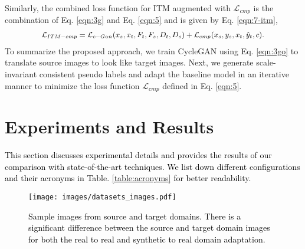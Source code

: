 \documentclass[final,5p,times,twocolumn]{elsarticle}
\begin{document}
Similarly, the combined loss function for ITM augmented with $\mathcal{L}_{cmp}$ is the combination of Eq. \ref{eqn:3g} and Eq. \ref{eqn:5}
and is given by Eq. \ref{eqn:7-itm},
\begin{equation}
\small
\begin{split}
\mathcal{L}_{ITM-cmp} = \mathcal{L}_{c-Gan} ( x_s, x_t, F_t, F_s, D_t, D_s)
    + \mathcal{L}_{cmp} ( x_s, y_s, x_t, \hat{y}_t, c).
\end{split}
\label{eqn:7-itm}
\end{equation}
To summarize the proposed approach, we train CycleGAN using Eq. \ref{eqn:3go} to translate source images to look like target images. Next, we generate scale-invariant consistent pseudo labels and adapt the baseline model in an iterative manner to minimize the loss function $\mathcal{L}_{cmp}$ defined in Eq. \ref{eqn:5}.  

\section{Experiments and Results}
\label{sec:exp}
\textcolor{black}{This section discusses experimental details and provides the results of our comparison with state-of-the-art techniques.
We list down different configurations and their acronyms in Table. \ref{table:acronyms} for better readability. }
\begin{table}[H]
\footnotesize
\centering
\caption{Different configurations and their acronyms.}
\label{table:acronyms}
\end{table}


\begin{figure*}[t]
 	\centering
 	\texttt{[image: images/datasets\_images.pdf]}
 	\scriptsize
 	\caption{\textcolor{black}{Sample images from source and target domains. There is a significant difference between the source and target domain images for both the real to real and synthetic to real domain adaptation. }}
 	\label{img:datasets-images}
\end{figure*}
\end{document}
